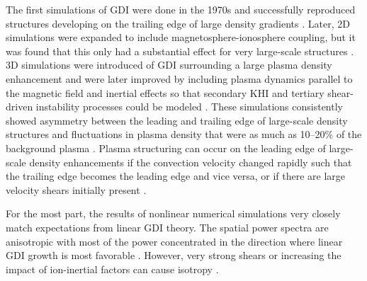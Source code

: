 The first simulations of GDI were done in the 1970s and successfully reproduced structures developing on the trailing edge of large density gradients \citep{Zabusky1973,Doles1976,Scannapieco1976,Ossakow1975,Ossakow1977}.  Later, 2D simulations were expanded to include magnetosphere-ionosphere coupling, but it was found that this only had a substantial effect for very large-scale structures \citep{Keskinen1990}.  3D simulations were introduced of GDI surrounding a large plasma density enhancement \citep{Guzdar1998} and were later improved by including plasma dynamics parallel to the magnetic field and inertial effects so that secondary KHI and tertiary shear-driven instability processes could be modeled \citep{Gondarenko1999}.  These simulations consistently showed asymmetry between the leading and trailing edge of large-scale density structures and fluctuations in plasma density that were as much as 10--20\% of the background plasma \citep{Gondarenko2004a,Gondarenko2004b}.  Plasma structuring can occur on the leading edge of large-scale density enhancements if the convection velocity changed rapidly such that the trailing edge becomes the leading edge and vice versa, or if there are large velocity shears initially present \citep{Gondarenko2004a,Gondarenko2004b}.

For the most part, the results of nonlinear numerical simulations very closely match expectations from linear GDI theory.  The spatial power spectra are anisotropic with most of the power concentrated in the direction where linear GDI growth is most favorable \citep{Keskinen1981,Keskinen1982,Gondarenko2001,Gondarenko2004b}.  However, very strong shears or increasing the impact of ion-inertial factors can cause isotropy \citep{Gondarenko2001,Gondarenko2006}.



